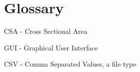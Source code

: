 \section{Glossary}
 CSA - Cross Sectional Area
 
 GUI - Graphical User Interface 
 
 CSV - Comma Separated Values, a file type
 
 
